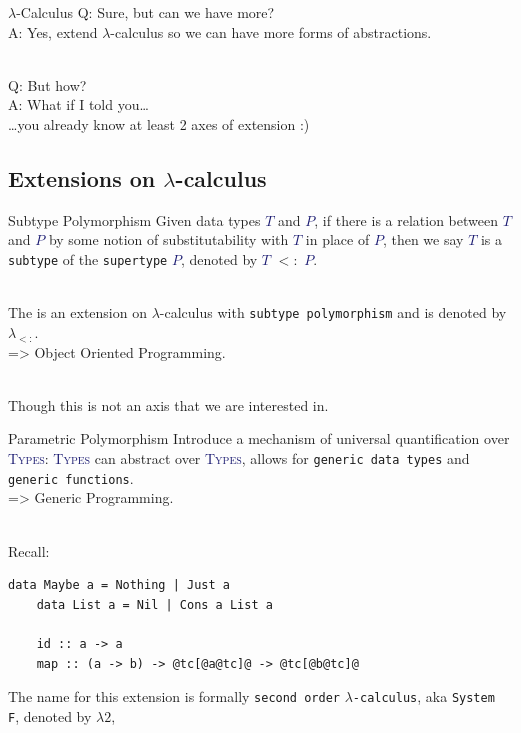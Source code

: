 \documentclass[xcolor={usenames,dvipsnames}]{beamer}
\newcommand{\htycon}[1]{\textcolor{MidnightBlue}{\textsc{#1}}}
\begin{document}
\begin{frame}[fragile]{$\lambda$-Calculus}
  Q: Sure, but can we have more?\\
  \pause
  A: Yes, extend $\lambda$-calculus so we can have more forms of abstractions.

  \ \\
  \pause
  Q: But how?\\
  \pause
  A: What if I told you\ldots\\
  \pause
  \qquad \ldots you already know at least 2 axes of extension :)
\end{frame}


\subsection{Extensions on $\lambda$-calculus}

\begin{frame}[fragile]{Subtype Polymorphism}
  Given data types \htycon{$T$} and \htycon{$P$}, if there is a relation between \htycon{$T$} and \htycon{$P$} by some notion of substitutability with \htycon{$T$} in place of \htycon{$P$}, then we say \htycon{$T$} is a \texttt{subtype} of the \texttt{supertype} \htycon{$P$}, denoted by \htycon{$T$} $<:$ \htycon{$P$}.

  \ \\
  \pause
  The is an extension on $\lambda$-calculus with \texttt{subtype polymorphism} and is denoted by $\lambda_{<:}$.\\
  \pause
  => Object Oriented Programming.
  
  \ \\
  \pause
  Though this is not an axis that we are interested in.
\end{frame}

\begin{frame}[fragile]{Parametric Polymorphism}
  Introduce a mechanism of universal quantification over \htycon{Types}: \htycon{Types} can abstract over \htycon{Types}, allows for \texttt{generic data types} and \texttt{generic functions}.\\
  \pause
  => Generic Programming.

  \ \\
  \pause
  Recall:
  \begin{lstlisting}[style=hask]
    data Maybe a = Nothing | Just a
    data List a = Nil | Cons a List a

    id :: a -> a
    map :: (a -> b) -> @tc[@a@tc]@ -> @tc[@b@tc]@
  \end{lstlisting}

  \pause
  The name for this extension is formally \texttt{second order} $\lambda$\texttt{-calculus}, aka \texttt{System F}, denoted by $\lambda2$,
\end{frame}
\end{document}
